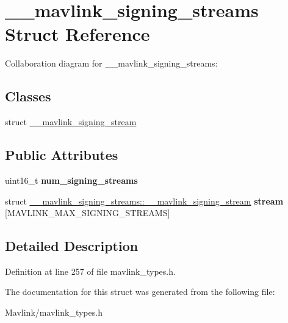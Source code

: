 \hypertarget{struct____mavlink__signing__streams}{}\section{\+\_\+\+\_\+mavlink\+\_\+signing\+\_\+streams Struct Reference}
\label{struct____mavlink__signing__streams}


Collaboration diagram for \+\_\+\+\_\+mavlink\+\_\+signing\+\_\+streams\+:
\subsection*{Classes}
\begin{DoxyCompactItemize}
\item 
struct \hyperlink{struct____mavlink__signing__streams_1_1____mavlink__signing__stream}{\+\_\+\+\_\+mavlink\+\_\+signing\+\_\+stream}
\end{DoxyCompactItemize}
\subsection*{Public Attributes}
\begin{DoxyCompactItemize}
\item 
\hypertarget{struct____mavlink__signing__streams_a21844f3fe728695a8e33a4b003591979}{}\label{struct____mavlink__signing__streams_a21844f3fe728695a8e33a4b003591979} 
uint16\+\_\+t {\bfseries num\+\_\+signing\+\_\+streams}
\item 
\hypertarget{struct____mavlink__signing__streams_a76b029e55c2ea2d8a90b7dd1c4776ffb}{}\label{struct____mavlink__signing__streams_a76b029e55c2ea2d8a90b7dd1c4776ffb} 
struct \hyperlink{struct____mavlink__signing__streams_1_1____mavlink__signing__stream}{\+\_\+\+\_\+mavlink\+\_\+signing\+\_\+streams\+::\+\_\+\+\_\+mavlink\+\_\+signing\+\_\+stream} {\bfseries stream} \mbox{[}M\+A\+V\+L\+I\+N\+K\+\_\+\+M\+A\+X\+\_\+\+S\+I\+G\+N\+I\+N\+G\+\_\+\+S\+T\+R\+E\+A\+MS\mbox{]}
\end{DoxyCompactItemize}


\subsection{Detailed Description}


Definition at line 257 of file mavlink\+\_\+types.\+h.



The documentation for this struct was generated from the following file\+:\begin{DoxyCompactItemize}
\item 
Mavlink/mavlink\+\_\+types.\+h\end{DoxyCompactItemize}
